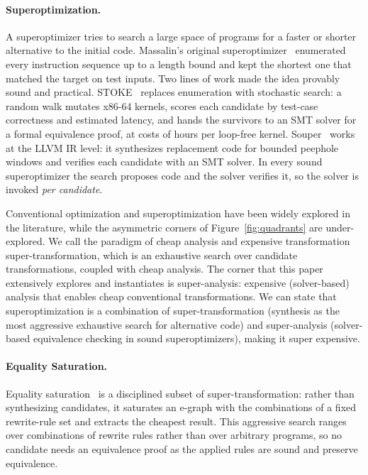 \documentclass[acmsmall,screen,nonacm]{acmart}
\begin{document}
\paragraph{Superoptimization.} A superoptimizer tries to search a large space of programs for a faster or shorter alternative to the initial code.
Massalin's original superoptimizer~\cite{massalin1987superoptimizer}
enumerated every instruction sequence up to a length bound and kept the
shortest one that matched the target on test inputs. Two lines of work
made the idea provably sound and practical. STOKE~\cite{schkufza2013stoke} replaces
enumeration with stochastic search: a random walk
mutates x86-64 kernels, scores each candidate by test-case correctness
and estimated latency, and hands the survivors to an SMT solver for a
formal equivalence proof, at costs of hours per loop-free kernel.
Souper~\cite{sasnauskas2017souper} works at the LLVM IR level: it
synthesizes replacement code for bounded peephole windows and verifies each
candidate with an SMT solver. In every sound superoptimizer the search proposes code and the solver
verifies it, so the solver is invoked \emph{per candidate}. 

Conventional optimization and superoptimization have been widely explored in the literature, while the asymmetric corners of Figure~\ref{fig:quadrants} are under-explored. We call the paradigm of cheap analysis and expensive transformation super-transformation, which is an exhaustive search over candidate transformations, coupled with cheap analysis. The corner that this paper extensively explores and instantiates is super-analysis: expensive (solver-based) analysis that enables cheap conventional transformations. We can state that superoptimization is a combination of super-transformation (synthesis as the most aggressive exhaustive search for alternative code) and super-analysis (solver-based equivalence checking in sound superoptimizers), making it super expensive.


\paragraph{Equality Saturation.}
Equality
saturation~\cite{tate2009equality} is a disciplined subset of super-transformation: rather than synthesizing candidates, it saturates an
e-graph with the combinations of a fixed rewrite-rule set and extracts
the cheapest result. This aggressive search ranges over combinations of rewrite rules rather than over
arbitrary programs, so no candidate needs an equivalence proof as the applied rules are sound and preserve equivalence.
\end{document}
